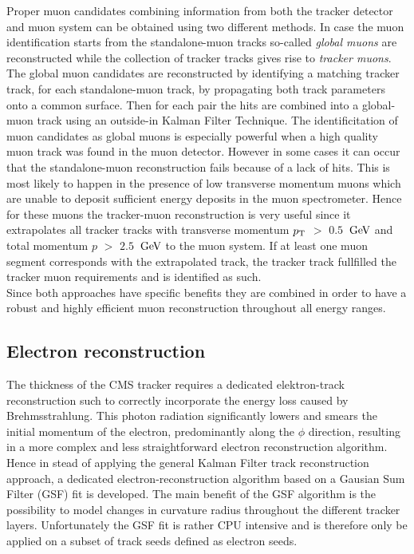 Proper muon candidates combining information from both the tracker detector and muon system can be obtained using two different methods. In case the muon identification starts from the standalone-muon tracks so-called \textit{global muons} are reconstructed while the collection of tracker tracks gives rise to \textit{tracker muons}.
The global muon candidates are reconstructed by identifying a matching tracker track, for each standalone-muon track, by propagating both track parameters onto a common surface. Then for each pair the hits are combined into a global-muon track using an outside-in Kalman Filter Technique. The identificitation of muon candidates as global muons is especially powerful when a high quality muon track was found in the muon detector. However in some cases it can occur that the standalone-muon reconstruction fails because of a lack of hits. This is most likely to happen in the presence of low transverse momentum muons which are unable to deposit sufficient energy deposits in the muon spectrometer. Hence for these muons the tracker-muon reconstruction is very useful since it extrapolates all tracker tracks with transverse momentum $p_{\rm T}$ $>$ $0.5$ $\, \mathrm{GeV}$ and total momentum $p$ $>$ $2.5$ $\, \mathrm{GeV}$ to the muon system. If at least one muon segment corresponds with the extrapolated track, the tracker track fullfilled the tracker muon requirements and is identified as such.
\\
Since both approaches have specific benefits they are combined in order to have a robust and highly efficient muon reconstruction throughout all energy ranges.
 
\subsection{Electron reconstruction} \label{subsec::Electron}

The thickness of the CMS tracker requires a dedicated elektron-track reconstruction such to correctly incorporate the energy loss caused by Brehmsstrahlung. 
This photon radiation significantly lowers and smears the initial momentum of the electron, predominantly along the $\phi$ direction, resulting in a more complex and less straightforward electron reconstruction algorithm.
Hence in stead of applying the general Kalman Filter track reconstruction approach, a dedicated electron-reconstruction algorithm based on a Gausian Sum Filter (GSF) fit is developed. The main benefit of the GSF algorithm is the possibility to model changes in curvature radius throughout the different tracker layers. 
Unfortunately the GSF fit is rather CPU intensive and is therefore only be applied on a subset of track seeds defined as electron seeds.


